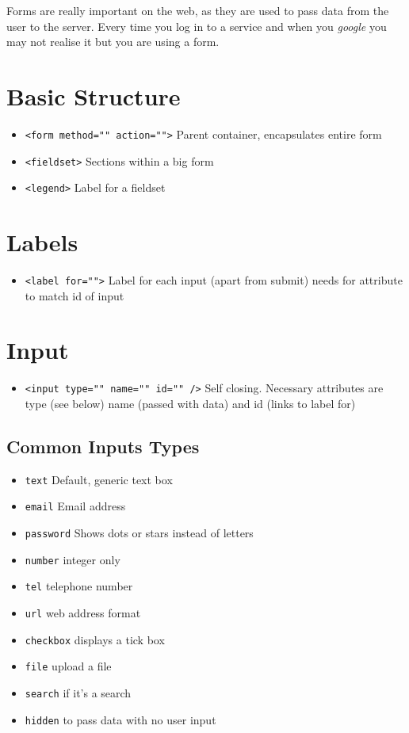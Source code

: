 Forms are really important on the web, as they are used to pass data from the user to the server. Every time you log in to a service and when you \textit{google} you may not realise it but you are using a form.

\section{Basic Structure}

\begin{itemize}
    \item \texttt{<form method="" action="">} Parent container, encapsulates entire form
    \item \texttt{<fieldset>} Sections within a big form
    \item \texttt{<legend>} Label for a fieldset
\end{itemize}

\section{Labels}

\begin{itemize}
    \item \texttt{<label for="">} Label for each input (apart from submit) needs for attribute to match id of input
\end{itemize}

\section{Input}

\begin{itemize}
    \item \texttt{<input type="" name="" id="" />} Self closing. Necessary attributes are type (see below) name (passed with data) and id (links to label for)
\end{itemize}


\subsection{Common Inputs Types}

\begin{itemize}
    \item \texttt{text} Default, generic text box
    \item \texttt{email} Email address
    \item \texttt{password} Shows dots or stars instead of letters
    \item \texttt{number} integer only
    \item \texttt{tel} telephone number
    \item \texttt{url} web address format
    \item \texttt{checkbox} displays a tick box
    \item \texttt{file} upload a file
    \item \texttt{search} if it's a search
    \item \texttt{hidden} to pass data with no user input
\end{itemize}

